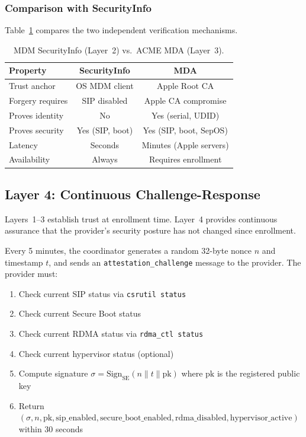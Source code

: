 \documentclass[10pt,twocolumn,letterpaper]{article}
\begin{document}
\subsubsection{Comparison with SecurityInfo}

Table~\ref{tab:secinfo-vs-mda} compares the two independent verification mechanisms.

\begin{table}[h]
\centering
\caption{MDM SecurityInfo (Layer~2) vs.\ ACME MDA (Layer~3).}
\vspace{4pt}
\small
\begin{tabular}{@{}lcc@{}}
\toprule
\textbf{Property} & \textbf{SecurityInfo} & \textbf{MDA} \\
\midrule
Trust anchor & OS MDM client & Apple Root CA \\
Forgery requires & SIP disabled & Apple CA compromise \\
Proves identity & No & Yes (serial, UDID) \\
Proves security & Yes (SIP, boot) & Yes (SIP, boot, SepOS) \\
Latency & Seconds & Minutes (Apple servers) \\
Availability & Always & Requires enrollment \\
\bottomrule
\end{tabular}
\label{tab:secinfo-vs-mda}
\end{table}

\subsection{Layer 4: Continuous Challenge-Response}
\label{sec:challenge}

Layers~1--3 establish trust at enrollment time. Layer~4 provides continuous assurance that the provider's security posture has not changed since enrollment.

Every 5 minutes, the coordinator generates a random 32-byte nonce $n$ and timestamp $t$, and sends an \texttt{attestation\_challenge} message to the provider. The provider must:

\begin{enumerate}[leftmargin=*,itemsep=1pt]
    \item Check current SIP status via \texttt{csrutil status}
    \item Check current Secure Boot status
    \item Check current RDMA status via \texttt{rdma\_ctl status}
    \item Check current hypervisor status (optional)
    \item Compute signature $\sigma = \text{Sign}_{\text{SE}}(n \| t \| \text{pk})$ where $\text{pk}$ is the registered public key
    \item Return $(\sigma, n, \text{pk}, \text{sip\_enabled}, \text{secure\_boot\_enabled}, \text{rdma\_disabled}, \text{hypervisor\_active})$ within 30 seconds
\end{enumerate}
\end{document}
